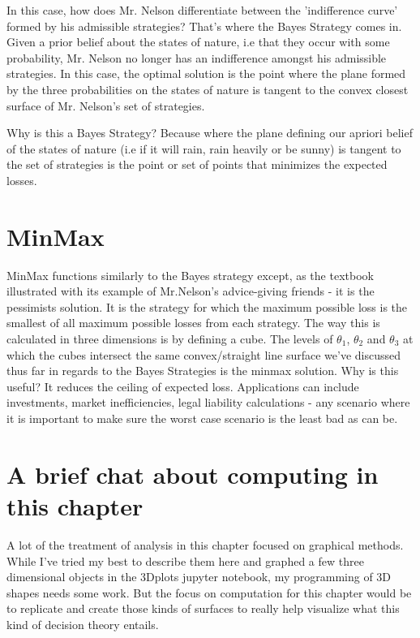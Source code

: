 \documentclass{article}
\begin{document}
In this case, how does Mr. Nelson differentiate between the 'indifference curve' formed by his admissible strategies? That's where the Bayes Strategy comes in. Given a prior belief about the states of nature, i.e that they occur with some probability, Mr. Nelson no longer has an indifference amongst his admissible strategies. In this case, the optimal solution is the point where the plane formed by the three probabilities on the states of nature is tangent to the convex closest surface of Mr. Nelson's set of strategies. 

Why is this a Bayes Strategy? Because where the plane defining our apriori belief of the states of nature (i.e if it will rain, rain heavily or be sunny) is tangent to the set of strategies is the point or set of points that minimizes the expected losses. 

\section{MinMax}
MinMax functions similarly to the Bayes strategy except, as the textbook illustrated with its example of Mr.Nelson's advice-giving friends - it is the pessimists solution. It is the strategy for which the maximum possible loss is the smallest of all maximum possible losses from each strategy. 
The way this is calculated in three dimensions is by defining a cube. The levels of $\theta_1$, $\theta_2$ and $\theta_3$ at which the cubes intersect the same convex/straight line surface we've discussed thus far in regards to the Bayes Strategies is the minmax solution. Why is this useful? It reduces the ceiling of expected loss. Applications can include investments, market inefficiencies, legal liability calculations - any scenario where it is important to make sure the worst case scenario is the least bad as can be. 

\section{A brief chat about computing in this chapter}

A lot of the treatment of analysis in this chapter focused on graphical methods. While I've tried my best to describe them here and graphed a few three dimensional objects in the 3Dplots jupyter notebook, my programming of 3D shapes needs some work. But the focus on computation for this chapter would be to replicate and create those kinds of surfaces to really help visualize what this kind of decision theory entails.  
\end{document}
